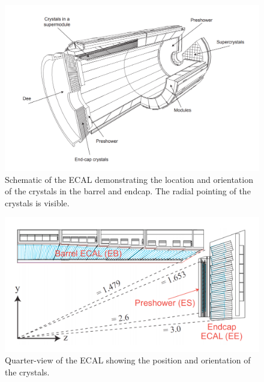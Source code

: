 \begin{figure}[htb]
\centering
  \includegraphics[width=0.9\linewidth]{plots/CMS/ecal_1.PNG}
  \caption{Schematic of the ECAL demonstrating the location and orientation of the crystals in the barrel and endcap. The radial pointing of the crystals is visible.~\protect\cite{Benaglia_2014}}
  \label{fig:cms:ecal1}
\end{figure}

\begin{figure}[htb]
\centering
  \includegraphics[width=0.7\linewidth]{plots/CMS/ecal_2.PNG}
  \caption{Quarter-view of the ECAL showing the position and orientation of the crystals.~\protect\cite{Benaglia_2014}}
  \label{fig:cms:ecal2}
\end{figure}